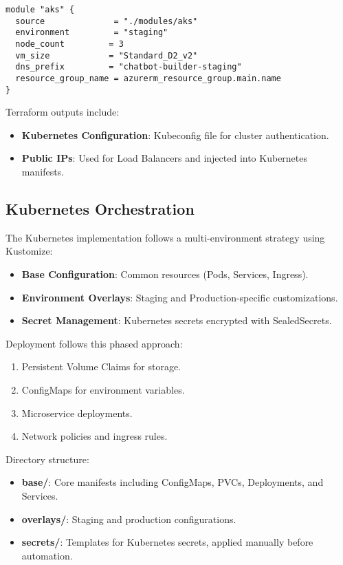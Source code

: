 \begin{lstlisting}[language=HCL,caption=Sample Terraform module for AKS]
module "aks" {
  source              = "./modules/aks"
  environment         = "staging"
  node_count         = 3
  vm_size            = "Standard_D2_v2"
  dns_prefix         = "chatbot-builder-staging"
  resource_group_name = azurerm_resource_group.main.name
}
\end{lstlisting}

Terraform outputs include:
\begin{itemize}
    \item \textbf{Kubernetes Configuration}: Kubeconfig file for cluster authentication.
    \item \textbf{Public IPs}: Used for Load Balancers and injected into Kubernetes manifests.
\end{itemize}

\subsection{Kubernetes Orchestration}
The Kubernetes implementation follows a multi-environment strategy using Kustomize:

\begin{itemize}
    \item \textbf{Base Configuration}: Common resources (Pods, Services, Ingress).
    \item \textbf{Environment Overlays}: Staging and Production-specific customizations.
    \item \textbf{Secret Management}: Kubernetes secrets encrypted with SealedSecrets.
\end{itemize}

Deployment follows this phased approach:
\begin{enumerate}
    \item Persistent Volume Claims for storage.
    \item ConfigMaps for environment variables.
    \item Microservice deployments.
    \item Network policies and ingress rules.
\end{enumerate}

Directory structure:
\begin{itemize}
    \item \textbf{base/}: Core manifests including ConfigMaps, PVCs, Deployments, and Services.
    \item \textbf{overlays/}: Staging and production configurations.
    \item \textbf{secrets/}: Templates for Kubernetes secrets, applied manually before automation.
\end{itemize}

